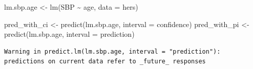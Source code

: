 \documentclass[
  letterpaper,
  DIV=11,
  numbers=noendperiod]{scrreport}
\newenvironment{Shaded}{\begin{snugshade}}{\end{snugshade}}
\newcommand{\AttributeTok}[1]{\textcolor[rgb]{0.40,0.45,0.13}{#1}}
\newcommand{\FunctionTok}[1]{\textcolor[rgb]{0.28,0.35,0.67}{#1}}
\newcommand{\NormalTok}[1]{\textcolor[rgb]{0.00,0.23,0.31}{#1}}
\newcommand{\OtherTok}[1]{\textcolor[rgb]{0.00,0.23,0.31}{#1}}
\newcommand{\SpecialCharTok}[1]{\textcolor[rgb]{0.37,0.37,0.37}{#1}}
\newcommand{\StringTok}[1]{\textcolor[rgb]{0.13,0.47,0.30}{#1}}
\begin{document}
\begin{Shaded}
\begin{Highlighting}[]
\NormalTok{lm.sbp.age }\OtherTok{\textless{}{-}} \FunctionTok{lm}\NormalTok{(SBP }\SpecialCharTok{\textasciitilde{}}\NormalTok{ age, }\AttributeTok{data =}\NormalTok{ hers)}

\NormalTok{pred\_with\_ci }\OtherTok{\textless{}{-}} \FunctionTok{predict}\NormalTok{(lm.sbp.age, }\AttributeTok{interval =} \StringTok{\textquotesingle{}confidence\textquotesingle{}}\NormalTok{)}
\NormalTok{pred\_with\_pi }\OtherTok{\textless{}{-}} \FunctionTok{predict}\NormalTok{(lm.sbp.age, }\AttributeTok{interval =} \StringTok{\textquotesingle{}prediction\textquotesingle{}}\NormalTok{)}
\end{Highlighting}
\end{Shaded}

\begin{verbatim}
Warning in predict.lm(lm.sbp.age, interval = "prediction"): predictions on current data refer to _future_ responses
\end{verbatim}
\end{document}
